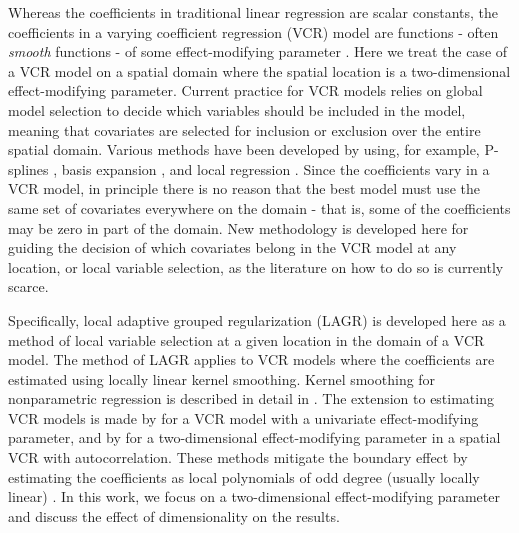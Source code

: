 \documentclass[authoryear,review, 12pt]{elsarticle}
\begin{document}
Whereas the coefficients in traditional linear regression are scalar
constants, the coefficients in a varying coefficient regression (VCR)
model are functions - often \emph{smooth} functions - of some effect-modifying
parameter \citep{Cleveland-Grosse-1991,Hastie-Tibshirani-1993}. Here
we treat the case of a VCR model on a spatial domain where the spatial
location is a two-dimensional effect-modifying parameter. Current
practice for VCR models relies on global model selection to decide
which variables should be included in the model, meaning that covariates
are selected for inclusion or exclusion over the entire spatial domain.
Various methods have been developed by using, for example, P-splines
\citep{Antoniadis:2012a}, basis expansion \citep{Wang-2008a}, and
local regression \citep{Wang-Xia-2009}. Since the coefficients vary
in a VCR model, in principle there is no reason that the best model
must use the same set of covariates everywhere on the domain - that
is, some of the coefficients may be zero in part of the domain. New
methodology is developed here for guiding the decision of which covariates
belong in the VCR model at any location, or local variable selection,
as the literature on how to do so is currently scarce.

Specifically, local adaptive grouped regularization (LAGR) is developed
here as a method of local variable selection at a given location
in the domain of a VCR model. The method of LAGR applies to VCR models
where the coefficients are estimated using locally linear kernel smoothing.
Kernel smoothing for nonparametric regression is described in detail
in \citet*{Fan-Gijbels-1996}. The extension to estimating VCR models
is made by \citet{Fan-Zhang-1999} for a VCR model with a univariate
effect-modifying parameter, and by \citet{Sun-Yan-Zhang-Lu-2014}
for a two-dimensional effect-modifying parameter in a spatial VCR
with autocorrelation. These methods mitigate the boundary effect by
estimating the coefficients as local polynomials of odd degree (usually
locally linear) \citep{Hastie:1993b}. In this work, we focus on a
two-dimensional effect-modifying parameter and discuss the effect
of dimensionality on the results.
\end{document}
